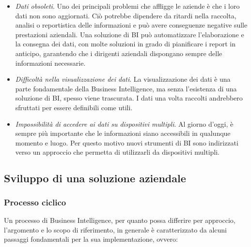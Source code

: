 \begin{itemize}
    \item \textit{Dati obsoleti}. Uno dei principali problemi che affligge le aziende è che i loro dati non sono aggiornati. Ciò potrebbe dipendere da ritardi nella raccolta, analisi o reportistica delle informazioni e può avere conseguenze negative sulle prestazioni aziendali. Una soluzione di BI può automatizzare l'elaborazione e la consegna dei dati, con molte soluzioni in grado di pianificare i report in anticipo, garantendo che i dirigenti aziendali dispongano sempre delle informazioni necessarie.
    \item \textit{Difficoltà nella visualizzazione dei dati}. La visualizzazione dei dati è una parte fondamentale della Business Intelligence, ma senza l'esistenza di una soluzione di BI, spesso viene trascurata. I dati una volta raccolti andrebbero sfruttati per essere definibili come utili.
    \item \textit{Impossibilità di accedere ai dati su dispositivi multipli}. Al giorno d'oggi, è sempre più importante che le informazioni siano accessibili in qualunque momento e luogo. Per questo motivo nuovi strumenti di BI sono indirizzati verso un approccio che permetta di utilizzarli da dispositivi multipli.
\end{itemize}

\subsection{Sviluppo di una soluzione aziendale}

\subsubsection{Processo ciclico}
Un processo di Business Intelligence, per quanto possa differire per approccio, l'argomento e lo scopo di riferimento, in generale è caratterizzato da alcuni passaggi fondamentali per la sua implementazione, ovvero:\cite{citeseerx_bi_process} 

